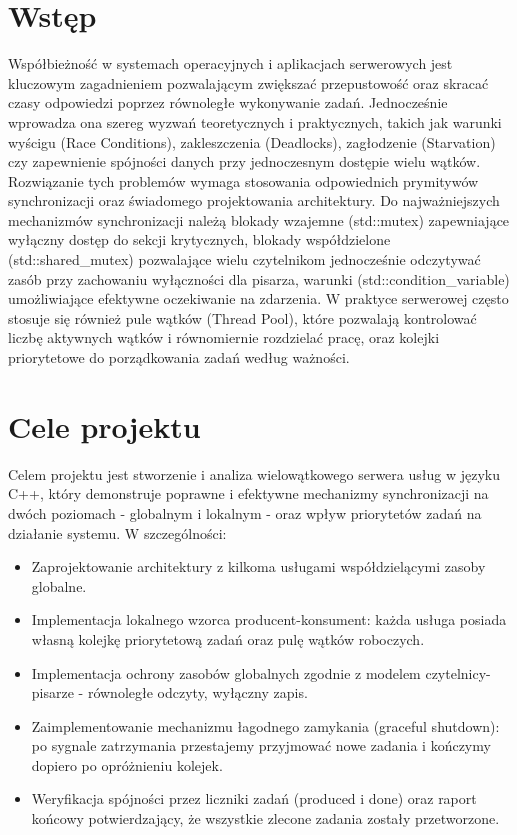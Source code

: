 \documentclass[a4paper,12pt]{article}
\begin{document}
    \section{Wstęp}
        \vspace{1em}
        Współbieżność w systemach operacyjnych i aplikacjach serwerowych jest kluczowym zagadnieniem pozwalającym zwiększać przepustowość oraz skracać czasy odpowiedzi poprzez równoległe wykonywanie zadań. Jednocześnie wprowadza ona szereg wyzwań teoretycznych i praktycznych, takich jak warunki wyścigu (Race Conditions), zakleszczenia (Deadlocks), zagłodzenie (Starvation) czy zapewnienie spójności danych przy jednoczesnym dostępie wielu wątków. Rozwiązanie tych problemów wymaga stosowania odpowiednich prymitywów synchronizacji oraz świadomego projektowania architektury. Do najważniejszych mechanizmów synchronizacji należą blokady wzajemne (std::mutex) zapewniające wyłączny dostęp do sekcji krytycznych, blokady współdzielone (std::shared\_mutex) pozwalające wielu czytelnikom jednocześnie odczytywać zasób przy zachowaniu wyłączności dla pisarza, warunki (std::condition\_variable) umożliwiające efektywne oczekiwanie na zdarzenia. W praktyce serwerowej często stosuje się również pule wątków (Thread Pool), które pozwalają kontrolować liczbę aktywnych wątków i równomiernie rozdzielać pracę, oraz kolejki priorytetowe do porządkowania zadań według ważności.
        \vspace{2em}
    \section{Cele projektu}
        \vspace{1em}
        Celem projektu jest stworzenie i analiza wielowątkowego serwera usług w języku C++, który demonstruje poprawne i efektywne mechanizmy synchronizacji na dwóch poziomach - globalnym i lokalnym - oraz wpływ priorytetów zadań na działanie systemu. W szczególności:
        \begin{itemize}
            \item Zaprojektowanie architektury z kilkoma usługami współdzielącymi zasoby globalne.
            \item Implementacja lokalnego wzorca producent-konsument: każda usługa posiada własną kolejkę priorytetową zadań oraz pulę wątków roboczych.
            \item Implementacja ochrony zasobów globalnych zgodnie z modelem czytelnicy-pisarze - równoległe odczyty, wyłączny zapis.
            \item Zaimplementowanie mechanizmu łagodnego zamykania (graceful shutdown): po sygnale zatrzymania przestajemy przyjmować nowe zadania i kończymy dopiero po opróżnieniu kolejek.
            \item Weryfikacja spójności przez liczniki zadań (produced i done) oraz raport końcowy potwierdzający, że wszystkie zlecone zadania zostały przetworzone.
        \end{itemize}
    \newpage
    \vspace*{1em}
\end{document}
